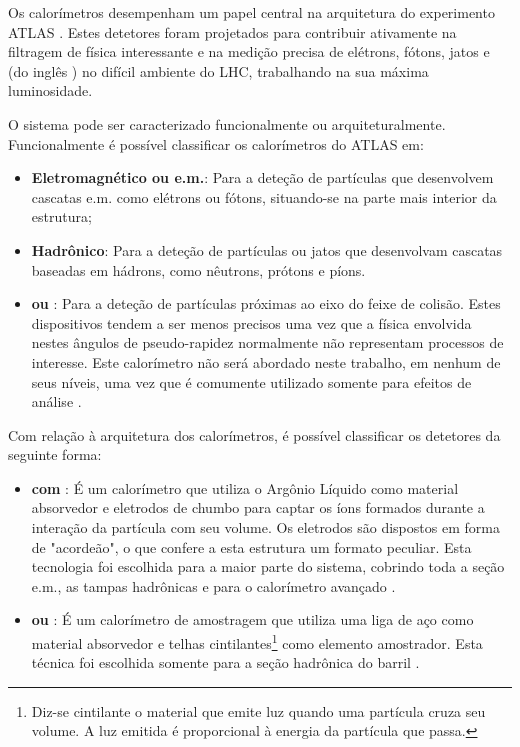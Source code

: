 Os calorímetros desempenham um papel central na arquitetura do experimento
ATLAS \cite{atlas-calo-tpr}. Estes detetores foram projetados para contribuir
ativamente na filtragem de física interessante e na medição precisa de
elétrons, fótons, jatos e  (do inglês
) no difícil ambiente do LHC, trabalhando na sua
máxima luminosidade.

O sistema pode ser caracterizado funcionalmente ou
arquiteturalmente. Funcionalmente é possível classificar os calorímetros do
ATLAS em:

\begin{itemize}
\item \textbf{Eletromagnético ou e.m.}: Para a deteção de partículas que
desenvolvem cascatas e.m. como elétrons ou fótons, situando-se na parte mais
interior da estrutura;

\item \textbf{Hadrônico}: Para a deteção de partículas ou jatos que
desenvolvam cascatas baseadas em hádrons, como nêutrons, prótons e píons.

\item \textbf{ ou }: Para a deteção de partículas
próximas ao eixo do feixe de colisão. Estes dispositivos tendem a ser menos
precisos uma vez que a física envolvida nestes ângulos de pseudo-rapidez
normalmente não representam processos de interesse. Este calorímetro não será
abordado neste trabalho, em nenhum de seus níveis, uma vez que é comumente
utilizado somente para efeitos de análise .
\end{itemize}

Com relação à arquitetura dos calorímetros, é possível classificar os
detetores da seguinte forma:

\begin{itemize}
\item \textbf{ com }: É um
calorímetro que utiliza o Argônio Líquido como material absorvedor e eletrodos
de chumbo para captar os íons formados durante a interação da partícula com
seu volume. Os eletrodos são dispostos em forma de "acordeão", o que confere a
esta estrutura um formato peculiar. Esta tecnologia foi escolhida para a maior
parte do sistema, cobrindo toda a seção e.m., as tampas hadrônicas e para o
calorímetro avançado \cite{lar-tdr}.

\item \textbf{ ou }: É um
calorímetro de amostragem que utiliza uma liga de aço como material absorvedor
e telhas cintilantes\footnote{Diz-se cintilante o material que emite luz
quando uma partícula cruza seu volume. A luz emitida é proporcional à energia
da partícula que passa.} como elemento amostrador. Esta técnica foi escolhida
somente para a seção hadrônica do barril \cite{tilecal}.
\end{itemize}

